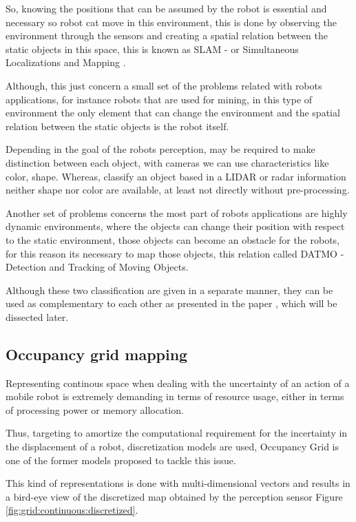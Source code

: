 \documentclass{llncs}
\begin{document}
So, knowing the positions that can be assumed by the robot is essential and necessary so robot cat move in this environment, this is done by observing the environment through the sensors and creating a spatial relation between the static objects in this space, this is known as SLAM - or Simultaneous Localizations and Mapping \cite{iyengar1991autonomous}.

Although, this just concern a small set of the problems related with robots applications, for instance robots that are used for mining, in this type of environment the only element that can change the environment and the spatial relation between the static objects is the robot itself. 

Depending in the goal of the robots perception, may be required to make distinction between each object, with cameras we can use characteristics like color, shape. Whereas, classify an object based in a LIDAR or radar information neither shape nor color are available, at least not directly without pre-processing.

Another set of problems concerns the most part of robots applications are highly dynamic environments, where the objects can change their position with respect to the static environment, those objects can become an obstacle for the robots, for this reason its necessary to map those objects, this relation called DATMO - Detection and Tracking of Moving Objects.

Although these two classification are given in a separate manner, they can be used as complementary to each other as presented in the paper \cite{Wang04a}, which will be dissected later.

\subsection{Occupancy grid mapping}

Representing continous space when dealing with the uncertainty of an action of a mobile robot is extremely demanding in terms of resource usage, either in terms of processing power or memory allocation.

Thus, targeting to amortize the computational requirement for the incertainty in the displacement of a robot, discretization models are used, Occupancy Grid\cite{Elfes:1989:UOG:68491.68495} is one of the former models proposed to tackle this issue.

This kind of representations is done with multi-dimensional vectors and results in a bird-eye view of the discretized map obtained by the perception sensor Figure \ref{fig:grid:continuous:discretized}.
\end{document}
